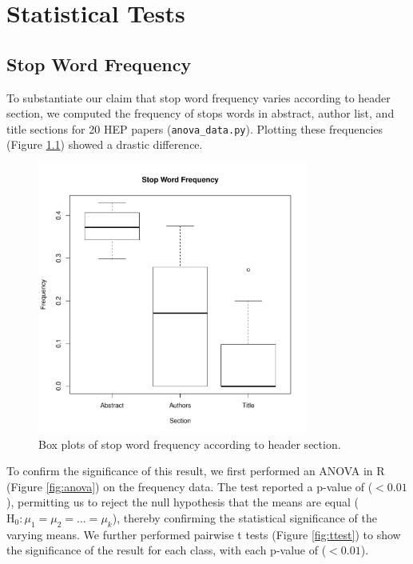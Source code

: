
\chapter{Statistical Tests} %

\label{AppendixC} %


\section{Stop Word Frequency}

To substantiate our claim that stop word frequency varies according to header section, we computed the frequency of stops words in  abstract, author list, and title sections for 20 HEP papers (\texttt{anova\_data.py}). Plotting these frequencies (Figure \ref{fig:means}) showed a drastic difference.

\begin{figure}[!ht]
\center
\includegraphics[width=3.5in]{Figures/means.pdf}
\caption{Box plots of stop word frequency according to header section.}
\label{fig:means}
\end{figure}

To confirm the significance of this result, we first performed an ANOVA in R (Figure \ref{fig:anova}) on the frequency data. The test reported a p-value of ($< 0.01$), permitting us to reject the null hypothesis that the means are equal ($\text{H}_0: \mu_1 = \mu_2 = \dots = \mu_k$), thereby confirming the statistical significance of the varying means. We further performed pairwise t tests (Figure \ref{fig:ttest}) to show the significance of the result for each class, with each p-value of ($< 0.01$).


